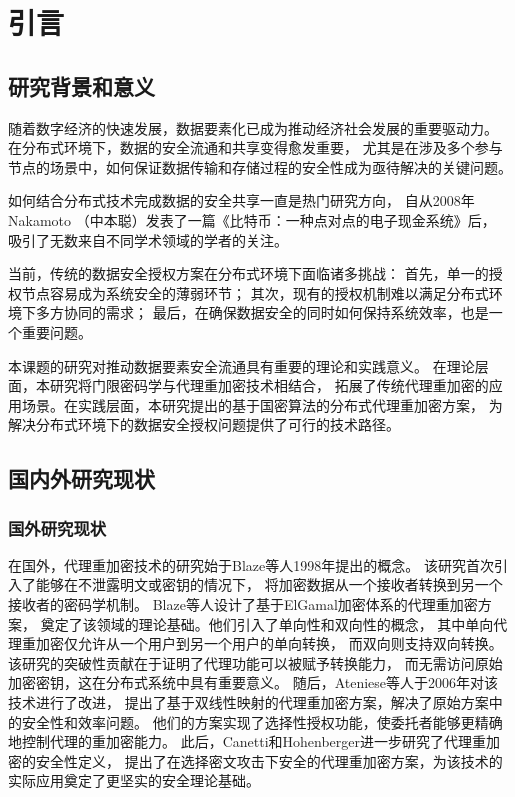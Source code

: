 \chapter{引言}
\vspace{-2cm}
\section{研究背景和意义}
随着数字经济的快速发展，数据要素化已成为推动经济社会发展的重要驱动力。
在分布式环境下，数据的安全流通和共享变得愈发重要，
尤其是在涉及多个参与节点的场景中，如何保证数据传输和存储过程的安全性成为亟待解决的关键问题。

如何结合分布式技术完成数据的安全共享一直是热门研究方向，
自从2008年Nakamoto
（中本聪）发表了一篇《比特币：一种点对点的电子现金系统》后，
吸引了无数来自不同学术领域的学者的关注。

当前，传统的数据安全授权方案在分布式环境下面临诸多挑战：
首先，单一的授权节点容易成为系统安全的薄弱环节；
其次，现有的授权机制难以满足分布式环境下多方协同的需求；
最后，在确保数据安全的同时如何保持系统效率，也是一个重要问题。

本课题的研究对推动数据要素安全流通具有重要的理论和实践意义。
在理论层面，本研究将门限密码学与代理重加密技术相结合，
拓展了传统代理重加密的应用场景。在实践层面，本研究提出的基于国密算法的分布式代理重加密方案，
为解决分布式环境下的数据安全授权问题提供了可行的技术路径。

\section{国内外研究现状}

\subsection{国外研究现状}

在国外，代理重加密技术的研究始于Blaze等人1998年提出的概念。
该研究首次引入了能够在不泄露明文或密钥的情况下，
将加密数据从一个接收者转换到另一个接收者的密码学机制。
Blaze等人设计了基于ElGamal加密体系的代理重加密方案，
奠定了该领域的理论基础。他们引入了单向性和双向性的概念，
其中单向代理重加密仅允许从一个用户到另一个用户的单向转换，
而双向则支持双向转换。该研究的突破性贡献在于证明了代理功能可以被赋予转换能力，
而无需访问原始加密密钥，这在分布式系统中具有重要意义。
随后，Ateniese等人于2006年对该技术进行了改进，
提出了基于双线性映射的代理重加密方案，解决了原始方案中的安全性和效率问题。
他们的方案实现了选择性授权功能，使委托者能够更精确地控制代理的重加密能力。
此后，Canetti和Hohenberger进一步研究了代理重加密的安全性定义，
提出了在选择密文攻击下安全的代理重加密方案，为该技术的实际应用奠定了更坚实的安全理论基础。

